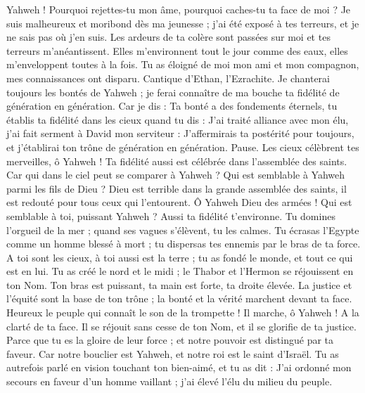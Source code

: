 \begin{multicols}{2}
Yahweh ! Pourquoi rejettes-tu mon âme, pourquoi caches-tu ta face de moi ?
Je suis malheureux et moribond dès ma jeunesse ; j'ai été exposé à tes terreurs, et je ne sais pas où j'en suis.
Les ardeurs de ta colère sont passées sur moi et tes terreurs m’anéantissent.
Elles m’environnent tout le jour comme des eaux, elles m’enveloppent toutes à la fois.
Tu as éloigné de moi mon ami et mon compagnon, mes connaissances ont disparu.
\VerseOne{}Cantique d'Ethan, l’Ezrachite.
Je chanterai toujours les bontés de Yahweh ; je ferai connaître de ma bouche ta fidélité de génération en génération.
Car je dis : Ta bonté a des fondements éternels, tu établis ta fidélité dans les cieux quand tu dis :
J'ai traité alliance avec mon élu, j'ai fait serment à David mon serviteur :
J’affermirais ta postérité pour toujours, et j'établirai ton trône de génération en génération. Pause.
Les cieux célèbrent tes merveilles, ô Yahweh ! Ta fidélité aussi est célébrée dans l'assemblée des saints.
Car qui dans le ciel peut se comparer à Yahweh ? Qui est semblable à Yahweh parmi les fils de Dieu ?
Dieu est terrible dans la grande assemblée des saints, il est redouté pour tous ceux qui l'entourent.
Ô Yahweh Dieu des armées ! Qui est semblable à toi, puissant Yahweh ? Aussi ta fidélité t’environne.
Tu domines l’orgueil de la mer ; quand ses vagues s'élèvent, tu les calmes.
Tu écrasas l’Egypte comme un homme blessé à mort ; tu dispersas tes ennemis par le bras de ta force.
A toi sont les cieux, à toi aussi est la terre ; tu as fondé le monde, et tout ce qui est en lui.
Tu as créé le nord et le midi ; le Thabor et l’Hermon se réjouissent en ton Nom.
Ton bras est puissant, ta main est forte, ta droite élevée.
La justice et l'équité sont la base de ton trône ; la bonté et la vérité marchent devant ta face.
Heureux le peuple qui connaît le son de la trompette ! Il marche, ô Yahweh ! A la clarté de ta face.
Il se réjouit sans cesse de ton Nom, et il se glorifie de ta justice.
Parce que tu es la gloire de leur force ; et notre pouvoir est distingué par ta faveur.
Car notre bouclier est Yahweh, et notre roi est le saint d'Israël.
Tu as autrefois parlé en vision touchant ton bien-aimé, et tu as dit : J'ai ordonné mon secours en faveur d'un homme vaillant ; j'ai élevé l'élu du milieu du peuple.

\end{multicols}
